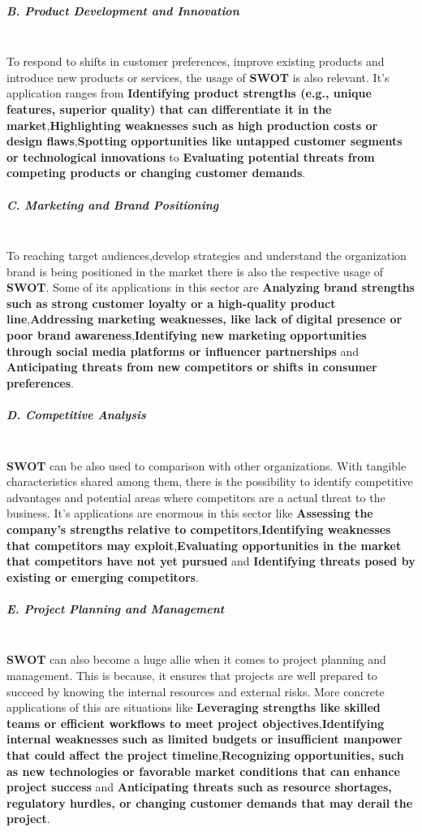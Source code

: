 \subparagraph{B. Product Development and Innovation}\mbox{}\\
To respond to shifts in customer preferences, improve existing products and introduce new products or services, the usage of \textbf{SWOT} is also relevant. It's application ranges from \textbf{Identifying product strengths (e.g., unique features, superior quality) that can differentiate it in the market},\textbf{Highlighting weaknesses such as high production costs or design flaws},\textbf{Spotting opportunities like untapped customer segments or technological innovations} to \textbf{Evaluating potential threats from competing products or changing customer demands}.
\subparagraph{C. Marketing and Brand Positioning}\mbox{}\\
To reaching target audiences,develop strategies and understand the organization brand is being positioned in the market there is also the respective usage of \textbf{SWOT}. Some of its applications in this sector are \textbf{Analyzing brand strengths such as strong customer loyalty or a high-quality product line},\textbf{Addressing marketing weaknesses, like lack of digital presence or poor brand awareness},\textbf{Identifying new marketing opportunities through social media platforms or influencer partnerships} and \textbf{Anticipating threats from new competitors or shifts in consumer preferences}.
\subparagraph{D. Competitive Analysis}\mbox{}\\
\textbf{SWOT} can be also used to comparison with other organizations. With tangible characteristics shared among them, there is the possibility to identify competitive advantages and potential areas where competitors are a actual threat to the business. It's applications are enormous in this sector like \textbf{Assessing the company's strengths relative to competitors},\textbf{Identifying weaknesses that competitors may exploit},\textbf{Evaluating opportunities in the market that competitors have not yet pursued} and \textbf{Identifying threats posed by existing or emerging competitors}.
\subparagraph{E. Project Planning and Management}\mbox{}\\
\textbf{SWOT} can also become a huge allie when it comes to project planning and management. This is because, it ensures that projects are well prepared to succeed by knowing the internal resources and external risks. More concrete applications of this are situations like \textbf{Leveraging strengths like skilled teams or efficient workflows to meet project objectives},\textbf{Identifying internal weaknesses such as limited budgets or insufficient manpower that could affect the project timeline},\textbf{Recognizing opportunities, such as new technologies or favorable market conditions that can enhance project success} and \textbf{Anticipating threats such as resource shortages, regulatory hurdles, or changing customer demands that may derail the project}.
